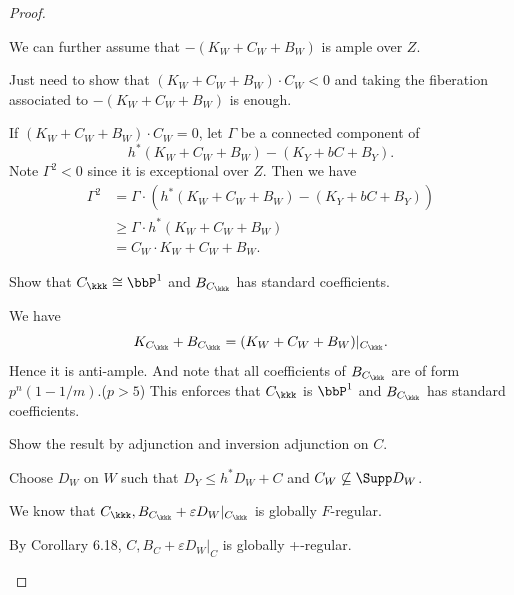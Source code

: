 \begin{proof}
        \begin{step}
            We can further assume that \(-(K_W + C_W + B_W)\) is ample over \(Z\).
        \end{step}
        \begin{subproof}
            Just need to show that \((K_W+C_W+B_W) \cdot C_W < 0\) and taking the fiberation associated to \(-(K_W+C_W+B_W)\) is enough.

            If \((K_W+C_W+B_W) \cdot C_W = 0\), let \(\Gamma\) be a connected component of 
            \[ h^*(K_W+C_W+B_W) - (K_Y + bC + B_Y) . \]
            Note \(\Gamma^2 < 0\) since it is exceptional over \(Z\).
            Then we have 
            \begin{align*}
                \Gamma^2 &= \Gamma \cdot (h^*(K_W+C_W+B_W) - (K_Y + bC + B_Y)) \\
                    &\geq \Gamma \cdot h^*(K_W+C_W+B_W) \\
                    &= C_W \cdot K_W + C_W + B_W.
            \end{align*}
        \end{subproof}

        \begin{step}
            Show that \(C_{\kkk} \cong \bbP^1\) and \(B_{C_{\kkk}}\) has standard coefficients.
        \end{step}
        \begin{subproof}
            We have 
            \[ K_{C_\kkk} + B_{C_{\kkk}} = (K_W + C_W + B_W)|_{C_{\kkk}}. \]
            Hence it is anti-ample.
            And note that all coefficients of \(B_{C_{\kkk}}\) are of form \(p^{n}(1-1/m)\).(\(p>5\))
            This enforces that \(C_{\kkk}\) is \(\bbP^1\) and \(B_{C_{\kkk}}\) has standard coefficients.
        \end{subproof}

        \begin{step}
            Show the result by adjunction and inversion adjunction on \(C\).
        \end{step}
        \begin{subproof}
            Choose \(D_W\) on \(W\) such that \(D_Y \leq h^*D_W + C\) and \(C_W \not\subseteq \Supp D_W\).

            We know that \(C_{\kkk}, B_{C_{\kkk}}+ \varepsilon D_W|_{C_{\kkk}}\) is globally \(F\)-regular.
            
            By Corollary 6.18, \(C,B_C + \varepsilon D_W|_C\) is globally +-regular.
            

\end{subproof}
\end{proof}
